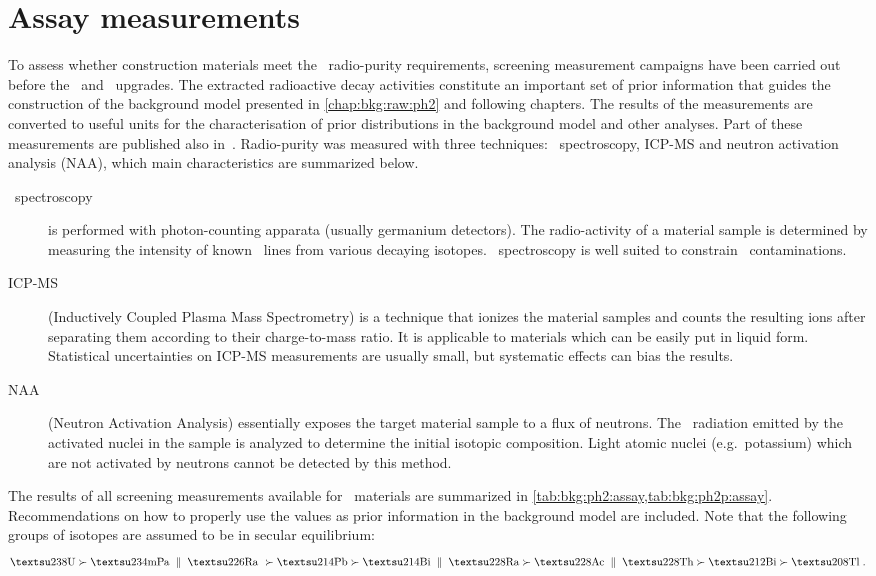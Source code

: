
\chapter{Assay measurements}%
\label{apdx:assay}

To assess whether construction materials meet the \gerda\ radio-purity requirements,
screening measurement campaigns have been carried out before the \phasetwo\ and \phasetwop\
upgrades. The extracted radioactive decay activities constitute an important set of prior
information that guides the construction of the background model presented in
\cref{chap:bkg:raw:ph2} and following chapters. The results of the measurements are
converted to useful units for the characterisation of prior distributions in the
background model and other analyses. Part of these measurements are published also
in~\cite{Agostini2018a}.
\newpar
Radio-purity was measured with three techniques: \g\ spectroscopy, ICP-MS and neutron
activation analysis (NAA), which main characteristics are summarized below.
\begin{description}
  \item[\g\ spectroscopy] is performed with photon-counting apparata (usually germanium
    detectors). The radio-activity of a material sample is determined by measuring the
    intensity of known \g\ lines from various decaying isotopes. \g\ spectroscopy is
    well suited to constrain \kvn\ contaminations.
  \item[ICP-MS] (Inductively Coupled Plasma Mass Spectrometry) is a technique that ionizes
    the material samples and counts the resulting ions after separating them according to
    their charge-to-mass ratio. It is applicable to materials which can be easily put in
    liquid form. Statistical uncertainties on ICP-MS measurements are usually small, but
    systematic effects can bias the results.
  \item[NAA] (Neutron Activation Analysis) essentially exposes the target material sample
    to a flux of neutrons. The \g\ radiation emitted by the activated nuclei in the sample
    is analyzed to determine the initial isotopic composition. Light atomic nuclei
    (e.g.~potassium) which are not activated by neutrons cannot be detected by this
    method.
\end{description}

The results of all screening measurements available for \gerdatwo\ materials are
summarized in \cref{tab:bkg:ph2:assay,tab:bkg:ph2p:assay}. Recommendations on how to
properly use the values as prior information in the background model are included. Note
that the following groups of isotopes are assumed to be in secular equilibrium:
\[
  \Uh           \succ \Pa             \;\; \| \;\;
  \Ra\          \succ \Pbh \succ \Bih \;\; \| \;\;
  \nuc{Ra}{228} \succ \Ac             \;\; \| \;\;
  \Th           \succ \Bil \succ \Tl  \;.
\]

